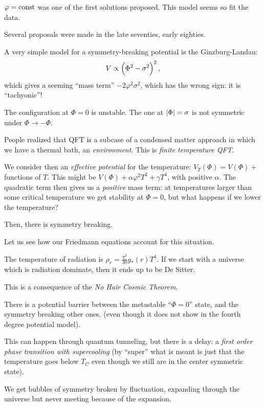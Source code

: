 \documentclass[main.tex]{subfiles}
\begin{document}
\(\varphi = \text{const}\) was one of the first solutions proposed.
This model seems so fit the data.

Several proposals were made in the late seventies, early eighties.

A very simple model for a symmetry-breaking potential is the Ginzburg-Landau:
%
\begin{align}
  V \propto \qty(\Phi^2 - \sigma^2)^2
\,,
\end{align}
%
which gives a seeming ``mass term'' \(- 2 \varphi^2 \sigma^2\), which has the wrong sign: it is ``tachyonic''!

The configuration at \(\Phi = 0\) is unstable. The one at \(\abs{\Phi } = \sigma \) is not symmetric under \(\Phi \rightarrow - \Phi \).

People realized that QFT is a subcase of a condensed matter approach in which we have a thermal bath, an \emph{environment}.
This is \emph{finite temperature QFT}.

We consider then an \emph{effective potential} for the temperature: \(V_T (\Phi ) = V(\Phi ) + \) functions of \(T\).
This might be \(V(\Phi ) + \alpha \varphi^2 T^2 + \gamma T^{4}\), with positive \(\alpha \). The quadratic term then gives us a \emph{positive} mass term: at temperatures larger than some critical temperature we get stability at \(\Phi = 0\), but what happens if we lower the temperature?

Then, there is symmetry breaking.

Let us see how our Friedmann equations account for this situation.

The temperature of radiation is \(\rho _r  = \frac{\pi^2}{30 } g_{*} (r) T^{4}\). If we start with a universe which is radiation dominate, then it ends up to be De Sitter.

This is a consequence of the \emph{No Hair Cosmic Theorem}.

There is a potential barrier between the metastable ``\(\Phi = 0\)'' state, and the symmetry breaking other ones.
(even though it does not show in the fourth degree potential model).

This can happen through quantum tunneling, but there is a delay: a \emph{first order phase transition with supercooling} (by ``super'' what is meant is just that the temperature goes below \(T_C\) even though we still are in the center symmetric state).

We get bubbles of symmetry broken by fluctuation, expanding through the universe but never meeting because of the expansion.
\end{document}
